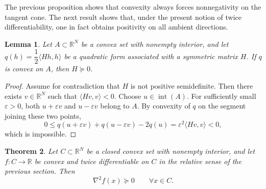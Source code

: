 \documentclass[reqno]{amsart}
\newtheorem{theorem}{Theorem}[section]
\newtheorem{lemma}[theorem]{Lemma}
\theoremstyle{definition}
\newcommand{\R}{\mathbb{R}}
\newcommand{\inner}[2]{\langle #1,#2\rangle}
\begin{document}
The previous proposition shows that convexity always forces nonnegativity on the
tangent cone. The next result shows that, under the present notion of twice
differentiability, one in fact obtains positivity on all ambient directions.

\begin{lemma}\label{lem:quadratic-open-set}
Let $A \subset \R^N$ be a convex set with nonempty interior, and let
$q(h)=\dfrac12\inner{Hh}{h}$ be a quadratic form associated with a symmetric
matrix $H$. If $q$ is convex on $A$, then $H \succeq 0$.
\end{lemma}

\begin{proof}
Assume for contradiction that $H$ is not positive semidefinite. Then there
exists $v \in \R^N$ such that $\inner{Hv}{v}<0$. Choose $u \in \operatorname{int}(A)$.
For sufficiently small $\varepsilon>0$, both $u+\varepsilon v$ and $u-\varepsilon v$
belong to $A$. By convexity of $q$ on the segment joining these two points,
\begin{equation}
    0 \leq q(u+\varepsilon v)+q(u-\varepsilon v)-2q(u)
    =\varepsilon^2\inner{Hv}{v}<0,
\end{equation}
which is impossible.
\end{proof}

\begin{theorem}\label{thm:boundary-psd}
Let $C \subset \R^N$ be a closed convex set with nonempty interior, and let
$f \colon C \to \R$ be convex and twice differentiable on $C$ in the relative
sense of the previous section. Then
\begin{equation}
    \nabla^2 f(x) \succeq 0 \qquad \forall x \in C.
\end{equation}
\end{theorem}
\end{document}
